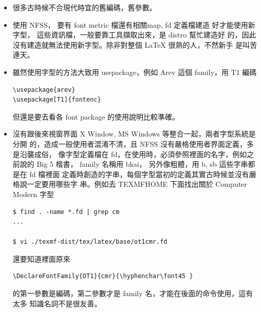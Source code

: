 \begin{itemize}
  \item 很多古時候不合現代時宜的舊編碼，舊參數。
  \item \LaTeXe{} 使用 NFSS， 要有 font metric 檔還有相關map, fd 定義檔建造
    好才能使用新字型， 這些資訊檔，一般要靠工具擷取出來，是 distro 幫忙建造好
    的，因此沒有建造就無法使用新字型。除非對整個 \LaTeX{} 很熟的人，不然新手
    是叫苦連天。
  \item 雖然使用字型的方法大致用 usepackage，例如 Arev 這個 family，用 T1 編碼
    \begin{verbatim}
\usepackage{arev}
\usepackage[T1]{fontenc}
    \end{verbatim}
    但還是要去看各 font package 的使用說明比較準確。
  \item 沒有跟後來視窗界面 X Window, MS Windows 等整合一起，兩者字型系統是分開
    的，造成一般使用者混淆不清，且 NFSS 沒有嚴格使用者界面定義，多是沿襲成俗，
    像字型定義檔在 fd，在使用時，必須參照裡面的名字，例如之前說的 Big 5
    楷書， family 名稱用 bkai， 另外像粗體，用 b, sb 這些字串都是在 fd 檔裡面
    定義時創造的字串，每個字型當初的定義其實古時候並沒有嚴格說一定要用哪些字
    串。例如去 TEXMFHOME 下面找出關於 Computer Modern 字型
    \begin{verbatim}
$ find . -name *.fd | grep cm
...

$ vi ./texmf-dist/tex/latex/base/ot1cmr.fd
    \end{verbatim}
    還要知道裡面原來
    \begin{verbatim}
\DeclareFontFamily{OT1}{cmr}{\hyphenchar\font45 }
    \end{verbatim}
    的第一參數是編碼，第二參數才是 family 名，才能在後面的命令使用，這有太多
    知識名詞不是很友善。
\end{itemize}


